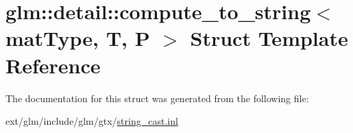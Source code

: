 \hypertarget{structglm_1_1detail_1_1compute__to__string}{\section{glm\-:\-:detail\-:\-:compute\-\_\-to\-\_\-string$<$ mat\-Type, T, P $>$ Struct Template Reference}
\label{structglm_1_1detail_1_1compute__to__string}
}


The documentation for this struct was generated from the following file\-:\begin{DoxyCompactItemize}
\item 
ext/glm/include/glm/gtx/\hyperlink{string__cast_8inl}{string\-\_\-cast.\-inl}\end{DoxyCompactItemize}
